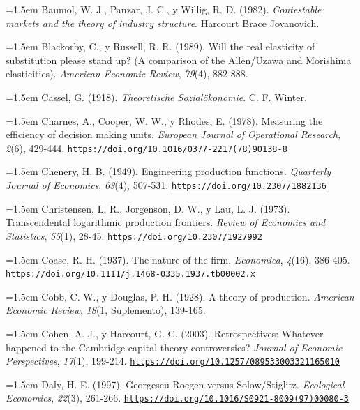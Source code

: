 \documentclass[10pt,a4paper]{article}
\begin{document}
\noindent\hangindent=1.5em Baumol, W. J., Panzar, J. C., y Willig, R. D. (1982). \textit{Contestable markets and the theory of industry structure}. Harcourt Brace Jovanovich.

\noindent\hangindent=1.5em Blackorby, C., y Russell, R. R. (1989). Will the real elasticity of substitution please stand up? (A comparison of the Allen/\allowbreak Uzawa and Morishima elasticities). \textit{American Economic Review}, \textit{79}(4), 882-888.

\noindent\hangindent=1.5em Cassel, G. (1918). \textit{Theoretische Sozialökonomie}. C. F. Winter.

\noindent\hangindent=1.5em Charnes, A., Cooper, W. W., y Rhodes, E. (1978). Measuring the efficiency of decision making units. \textit{European Journal of Operational Research}, \textit{2}(6), 429-444. \href{https://doi.org/10.1016/0377-2217(78)90138-8}{\nolinkurl{https://doi.org/10.1016/0377-2217(78)90138-8}}

\noindent\hangindent=1.5em Chenery, H. B. (1949). Engineering production functions. \textit{Quarterly Journal of Economics}, \textit{63}(4), 507-531. \href{https://doi.org/10.2307/1882136}{\nolinkurl{https://doi.org/10.2307/1882136}}

\noindent\hangindent=1.5em Christensen, L. R., Jorgenson, D. W., y Lau, L. J. (1973). Transcendental logarithmic production frontiers. \textit{Review of Economics and Statistics}, \textit{55}(1), 28-45. \href{https://doi.org/10.2307/1927992}{\nolinkurl{https://doi.org/10.2307/1927992}}

\noindent\hangindent=1.5em Coase, R. H. (1937). The nature of the firm. \textit{Economica}, \textit{4}(16), 386-405. \href{https://doi.org/10.1111/j.1468-0335.1937.tb00002.x}{\nolinkurl{https://doi.org/10.1111/j.1468-0335.1937.tb00002.x}}

\noindent\hangindent=1.5em Cobb, C. W., y Douglas, P. H. (1928). A theory of production. \textit{American Economic Review}, \textit{18}(1, Suplemento), 139-165.

\noindent\hangindent=1.5em Cohen, A. J., y Harcourt, G. C. (2003). Retrospectives: Whatever happened to the Cambridge capital theory controversies? \textit{Journal of Economic Perspectives}, \textit{17}(1), 199-214. \href{https://doi.org/10.1257/089533003321165010}{\nolinkurl{https://doi.org/10.1257/089533003321165010}}

\noindent\hangindent=1.5em Daly, H. E. (1997). Georgescu-Roegen versus Solow/Stiglitz. \textit{Ecological Economics}, \textit{22}(3), 261-266. \href{https://doi.org/10.1016/S0921-8009(97)00080-3}{\nolinkurl{https://doi.org/10.1016/S0921-8009(97)00080-3}}
\end{document}
